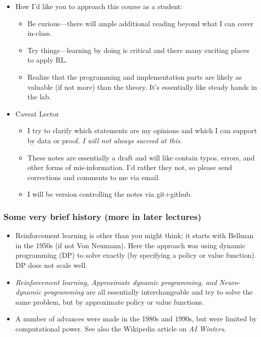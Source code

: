 \documentclass{beamer}
\begin{document}
\begin{frame}
  \begin{itemize}
  \item How I'd like you to approach this course as a student:
    \begin{itemize}
    \item Be curious---there will ample additional reading beyond what I can cover in-class.
    \item Try things---learning by doing is critical and there many exciting places to apply RL.
    \item Realize that the programming and implementation parts are likely as
      valuable (if not more) than the theory. It's essentially like steady hands in the lab.
    \end{itemize}
  \item Caveat Lector
    \begin{itemize}
    \item I try to clarify which statements are my opinions and which I can support by data or proof.
      {\em I will not always succeed at this.}
    \item These notes are essentially a draft and will like contain typos, errors, and other forms of mis-information.
      I'd rather they not, so please send corrections and comments to me via email.
    \item I will be version controlling the notes via git+github.
    \end{itemize}
  \end{itemize}
\end{frame}

\begin{frame}
  \frametitle{Some very brief history (more in later lectures)}
  \begin{itemize}
  \item Reinforcement learning is other than you might think; it starts with
    Bellman in the 1950s (if not Von Neumann). Here the approach was using dynamic
    programming (DP) to solve exactly (by specifying a policy or value function). DP
    does not scale well.
  \item {\em Reinforcement learning, Approximate dynamic programming, and
      Neuro-dynamic programming} are all essentially interchangeable and try to solve
    the same problem, but by approximate policy or value functions.
  \item A number of advances were made in the 1980s and 1990s, but were limited by
    computational power. See also the Wikipedia article on {\em AI Winters}.
  \end{itemize}
\end{frame}
\end{document}
